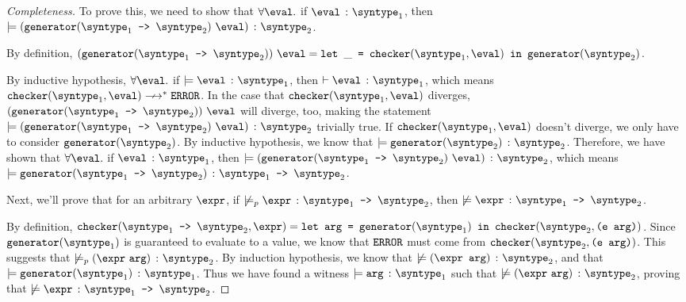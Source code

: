 \begin{proof}[Completeness]
  To prove this, we need to show that $\forall\eval.$ if $\hastype{\eval}{\syntype_1}$, then $\models \hastype{(\mkgen{\mkfun{\syntype_1}{\syntype_2}} \ \eval)}{\syntype_2}$.
  
  By definition, $(\mkgen{\mkfun{\syntype_1}{\syntype_2}}) \ \eval = \letin{\_}{\mkche{\syntype_1}{\eval}}{\mkgen{\syntype_2}}$.

  By inductive hypothesis, $\forall\eval.$ if $\models \hastype{\eval}{\syntype_1}$, then $\vdash \hastype{\eval}{\syntype_1}$, which means $\mkche{\syntype_1}{\eval}\nsmallsteps[] \eerror$. In the case that $\mkche{\syntype_1}{\eval}$ diverges, $(\mkgen{\mkfun{\syntype_1}{\syntype_2}}) \ \eval$ will diverge, too, making the statement $\models \hastype{(\mkgen{\mkfun{\syntype_1}{\syntype_2}} \ \eval)}{\syntype_2}$ trivially true. If $\mkche{\syntype_1}{\eval}$ doesn't diverge, we only have to consider $\mkgen{\syntype_2}$. By inductive hypothesis, we know that $\models \hastype{\mkgen{\syntype_2}}{\syntype_2}$. Therefore, we have shown that $\forall\eval.$ if $\hastype{\eval}{\syntype_1}$, then $\models \hastype{(\mkgen{\mkfun{\syntype_1}{\syntype_2}} \ \eval)}{\syntype_2}$, which means $\models \hastype{\mkgen{\mkfun{\syntype_1}{\syntype_2}}}{\mkfun{\syntype_1}{\syntype_2}}$.

  Next, we'll prove that for an arbitrary $\expr$, if $\not\models_p \hastype{\expr}{\mkfun{\syntype_1}{\syntype_2}}$, then $\not\models \hastype{\expr}{\mkfun{\syntype_1}{\syntype_2}}$.

  By definition, $\mkche{\mkfun{\syntype_1}{\syntype_2}}{\expr} = \texttt{let arg = }\mkgen{\syntype_1} \texttt{ in }\mkche{\syntype_2}{\texttt{(e arg)}}$. Since $\mkgen{\syntype_1}$ is guaranteed to evaluate to a value, we know that $\texttt{ERROR}$ must come from $\mkche{\syntype_2}{\texttt{(e arg)}}$. This suggests that $\not\models_p \hastype{(\expr\ \texttt{arg})}{\syntype_2}$. By induction hypothesis, we know that $\not\models \hastype{(\texttt{\expr\ \texttt{arg}})}{\syntype_2}$, and that $\models \hastype{\mkgen{\syntype_1}}{\syntype_1}$. Thus we have found a witness $\models \hastype{\texttt{arg}}{\syntype_1}$ such that $\not\models \hastype{(\expr \ \texttt{arg})}{\syntype_2}$, proving that $\not\models \hastype{\expr}{\mkfun{\syntype_1}{\syntype_2}}$.

\end{proof}

